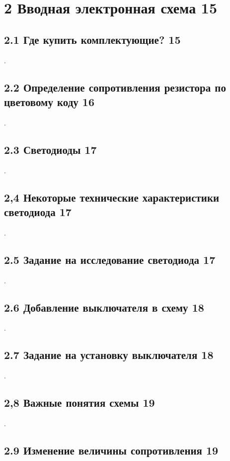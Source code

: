 
\chapter{2 Вводная электронная схема 15}

\section{2.1 Где купить комплектующие? 15}

.

\section{2.2 Определение сопротивления резистора по цветовому коду 16}

.

\section{2.3 Светодиоды 17}

.

\section{2,4 Некоторые технические характеристики светодиода 17}

.

\section{2.5 Задание на исследование светодиода 17}

.

\section{2.6 Добавление выключателя  в схему 18}

.

\section{2.7 Задание на установку выключателя 18}

.

\section{2,8 Важные понятия схемы 19}

.

\section{2.9 Изменение величины сопротивления 19}

